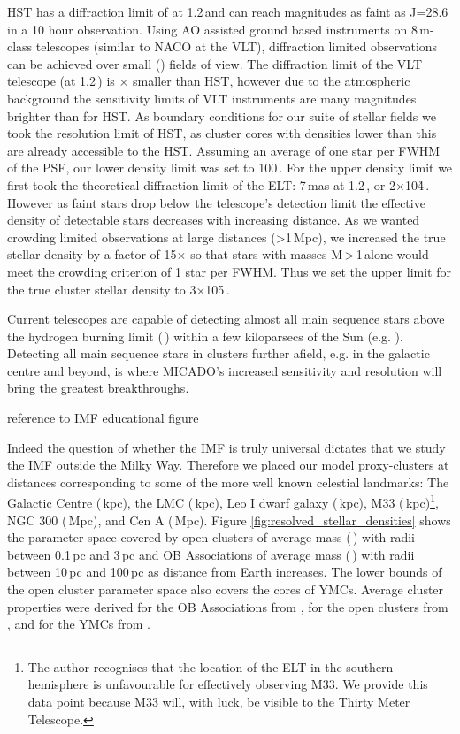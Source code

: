 HST has a diffraction limit of \arcsec at 1.2\,\um and can reach magnitudes as faint as J=28.6\m \citep{hst_wfc3} in a 10 hour observation. Using AO assisted ground based instruments on 8\,m-class telescopes (similar to NACO at the VLT), diffraction limited observations can be achieved over small (\arcmin) fields of view. 
The diffraction limit of the VLT telescope (\arcsec at 1.2\,\um) is $\times$ smaller than HST, however due to the atmospheric background the sensitivity limits of VLT instruments are many magnitudes brighter than for HST. 
As boundary conditions for our suite of stellar fields we took the resolution limit of HST, as cluster cores with densities lower than this are already accessible to the HST. 
Assuming an average of one star per FWHM of the PSF, our lower density limit was set to 100\,\spa. 
For the upper density limit we first took the theoretical diffraction limit of the ELT: 7\,mas at 1.2\,\ume, or 2$\times$10\h4\,\spae. However as faint stars drop below the telescope's detection limit the effective density of detectable stars decreases with increasing distance. 
As we wanted crowding limited observations at large distances (\textgreater1\,Mpc), we increased the true stellar density by a factor of 15$\times$ so that stars with masses M\,\textgreater\,1\,\msun alone would meet the crowding criterion of 1 star per FWHM. 
Thus we set the upper limit for the true cluster stellar density to 3$\times$10\h5\,\spa.

Current telescopes are capable of detecting almost all main sequence stars above the hydrogen burning limit (\,\msune) within a few kiloparsecs of the Sun (e.g. \citealt{muzic17}). 
Detecting all main sequence stars in clusters further afield, e.g. in the galactic centre and beyond, is where MICADO's increased sensitivity and resolution will bring the greatest breakthroughs. 

\rewrite reference to IMF educational figure


Indeed the question of whether the IMF is truly universal dictates that we study the IMF outside the Milky Way. 
Therefore we placed our model proxy-clusters at distances corresponding to some of the more well known celestial landmarks: The Galactic Centre (\,kpc), the LMC (\,kpc), Leo I dwarf galaxy (\,kpc), M33 (\,kpc)\footnote{The author recognises that the location of the ELT in the southern hemisphere is unfavourable for effectively observing M33. We provide this data point because M33 will, with luck, be visible to the Thirty Meter Telescope.}, NGC 300 (\,Mpc), and Cen A (\,Mpc). 
Figure \ref{fig:resolved_stellar_densities} shows the parameter space covered by open clusters of average mass (\,\msun) with radii between 0.1\,pc and 3\,pc and OB Associations of average mass (\,\msun) with radii between 10\,pc and 100\,pc as distance from Earth increases. 
The lower bounds of the open cluster parameter space also covers the cores of YMCs. Average cluster properties were derived for the OB Associations from \citet{melnik1995}, for the open clusters from \citet{piskunov2007}, and for the YMCs from \citet{portegies2010}.



